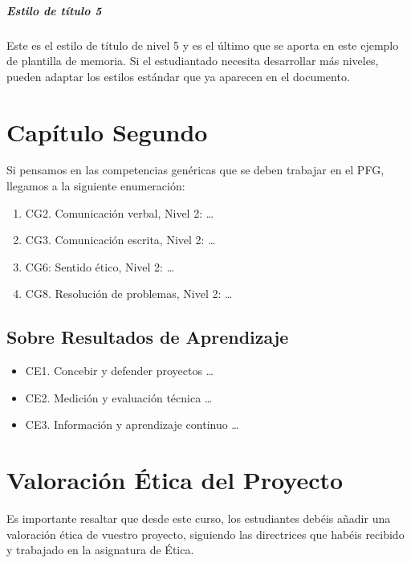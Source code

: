 \paragraph{Estilo de título 5}
Este es el estilo de título de nivel 5 y es el último que se aporta en este ejemplo de plantilla de memoria. Si el estudiantado necesita desarrollar más niveles, pueden adaptar los estilos estándar que ya aparecen en el documento.

\chapter{Capítulo Segundo}
Si pensamos en las competencias genéricas que se deben trabajar en el PFG, llegamos a la siguiente enumeración:
\begin{enumerate}
  \item CG2. Comunicación verbal, Nivel 2: \dots
  \item CG3. Comunicación escrita, Nivel 2: \dots
  \item CG6: Sentido ético, Nivel 2: \dots
  \item CG8. Resolución de problemas, Nivel 2: \dots
\end{enumerate}

\section{Sobre Resultados de Aprendizaje}
\begin{itemize}
  \item CE1. Concebir y defender proyectos \dots
  \item CE2. Medición y evaluación técnica \dots
  \item CE3. Información y aprendizaje continuo \dots
\end{itemize}

\chapter{Valoración Ética del Proyecto}

Es importante resaltar que desde este curso, los estudiantes debéis añadir una valoración ética de vuestro proyecto, siguiendo las directrices que habéis recibido y trabajado en la asignatura de Ética.

